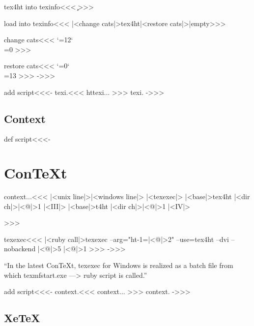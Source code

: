 \documentclass{article}
\begin{document}
\<tex4ht into texinfo\><<<
\ifx\c\comment\def\rm{\let\rm=\svrm|<load into texinfo|>}\expandafter\rm\fi>>>

\<load into texinfo\><<<
|<change cats|>\csname tex4ht\endcsname|<restore cats|>|empty>>>

\<change cats\><<<
\catcode`\@=12\catcode`\\=0 >>>

\<restore cats\><<<
\catcode`\@=0\catcode`\\=13 >>>
->>>


\<add script\><<<-
\<\pref texi.\ext\><<<
\<httexi...\>
>>> %
%
\OutputCodE\<\pref texi.\ext\>     %
%
->>>


\subsection{Context}


\<def script\><<<-
\section{ConTeXt}


\<context...\><<<
|<unix line|>|<windows line|>
        |<texexec|>
        |<base|>tex4ht |<dir ch|>|<@|>1 |<III|>
        |<base|>t4ht |<dir ch|>|<@|>1 |<IV|>

>>>

\<texexec\><<<
|<ruby call|>texexec --arg="ht-1=|<@|>2" --use=tex4ht --dvi --nobackend |<@|>5 |<@|>1 >>>
->>>


``In the latest ConTeXt, texexec for Windows is realized 
as a batch file from which texmfstart.exe ---> ruby script 
is called.'' 

\immediate{}
\immediate{}
\immediate{}


\<add script\><<<-
\<\pref context.\ext\><<<
\<context...\>
>>> %
%
\OutputCodE\<\pref context.\ext\>     %
%
->>>




\subsection{XeTeX}
\end{document}
